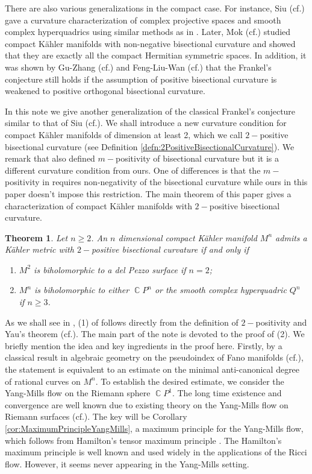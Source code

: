 \documentclass[11pt]{amsart}
\theoremstyle{plain}
\newtheorem{thm}{Theorem}[section]
\theoremstyle{definition}
\numberwithin{equation}{section}
\DeclareMathOperator{\C}{\mathbb{C}}
\begin{document}
There are also various generalizations in the compact case. For instance, Siu (cf.\cite{Siu80}) gave a curvature characterization of complex projective spaces and smooth complex hyperquadrics using similar methods as in \cite{SY80}. Later, Mok (cf.\cite{Mok88}) studied compact K\"{a}hler manifolds with non-negative bisectional curvature and showed that they are exactly all the compact Hermitian symmetric spaces. In addition, it was shown by Gu-Zhang (cf.\cite{GZ10}) and Feng-Liu-Wan (cf.\cite{FLW17}) that the Frankel's conjecture still holds if the assumption of positive bisectional curvature is weakened to positive orthogonal bisectional curvature.

In this note we give another generalization of the classical Frankel's conjecture similar to that of Siu (cf.\cite{Siu80}). We shall introduce a new curvature condition for compact K\"{a}hler manifolds of dimension at least 2, which we call $2-$positive bisectional curvature (see Definition \ref{defn:2PositiveBisectionalCurvature}). We remark that \cite{Siu80} also defined $m-$positivity of bisectional curvature but it is a different curvature condition from ours. One of differences is that the $m-$positivity in \cite{Siu80} requires non-negativity of the bisectional curvature while ours in this paper doesn't impose this restriction. The main theorem of this paper gives a characterization of compact K\"{a}hler manifolds with $2-$positive bisectional curvature.

\begin{thm}\label{thm:MainTheorem}
    Let $n\ge 2$. An $n$ dimensional compact K\"{a}hler manifold $M^n$ admits a K\"{a}hler metric with $2-$positive bisectional curvature if and only if
    \begin{enumerate}
        \item $M^2$ is biholomorphic to a del Pezzo surface if $n=2$;
        \item $M^n$ is biholomorphic to either $\C P^n$ or the smooth complex hyperquadric $Q^n$ if $n\ge 3$.
    \end{enumerate}
\end{thm}

As we shall see in , (1) of  follows directly from the definition of $2-$positivity and Yau's theorem (cf.\cite{Yau78}). The main part of the note is devoted to the proof of (2). We briefly mention the idea and key ingredients in the proof here. Firstly, by a classical result in algebraic geometry on the pseudoindex of Fano manifolds (cf.\cite{Miy04,DH17}), the statement is equivalent to an estimate on the minimal anti-canonical degree of rational curves on $M^n$. To establish the desired estimate, we consider the Yang-Mills flow on the Riemann sphere $\C P^1$. The long time existence and convergence are well known due to existing theory on the Yang-Mills flow on Riemann surfaces (cf.\cite{Don85,Das92,Rd92}). The key will be Corollary \ref{cor:MaximumPrincipleYangMills}, a maximum principle for the Yang-Mills flow, which follows from Hamilton's tensor maximum principle . The Hamilton's maximum principle is well known and used widely in the applications of the Ricci flow. However, it seems never appearing in the Yang-Mills setting.
\end{document}

